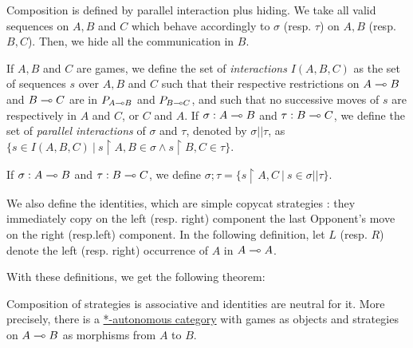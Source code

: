 Composition is defined by parallel interaction plus hiding. We take all
valid sequences on \(A, B\) and \(C\) which behave accordingly to
\(\sigma\) (resp. \(\tau\)) on \(A, B\) (resp. \(B,C\)). Then, we hide
all the communication in \(B\).

\begin{definition}
If $A, B$ and $C$ are games, we define the set of \emph{interactions} $I(A,B,C)$ as the set of sequences $s$ over $A, B$ and $C$ such that their respective restrictions on
$A\multimap B$ and $B\multimap C$ are in $P_{A\multimap B}$ and $P_{B\multimap C}$, and such that no successive
moves of $s$ are respectively in $A$ and $C$, or $C$ and $A$.
If $\sigma:A\multimap B$ and $\tau:B\multimap C$, we define the set of \emph{parallel interactions} of
$\sigma$ and $\tau$, denoted by $\sigma||\tau$, as $\{s\in I(A,B,C)~|~s\upharpoonright A,B\in \sigma \wedge s\upharpoonright B,C \in \tau\}$.
\end{definition}

\begin{definition}[Composition]
If $\sigma:A\multimap B$ and $\tau:B\multimap C$, we define $\sigma;\tau = \{s\upharpoonright A,C~|~s\in \sigma||\tau\}$.
\end{definition}

We also define the identities, which are simple copycat strategies :
they immediately copy on the left (resp. right) component the last
Opponent's move on the right (resp.left) component. In the following
definition, let \(L\) (resp. \(R\)) denote the left (resp. right)
occurrence of \(A\) in \(A\multimap A\).

With these definitions, we get the following theorem:

\begin{theorem}
Composition of strategies is associative and identities are neutral for it. More precisely, there is a \hyperref[autonomous-categories]{*-autonomous category} with games as objects and strategies on $A\multimap B$ as morphisms from $A$ to $B$.
\end{theorem}


